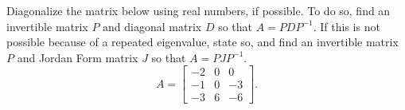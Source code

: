 \begin{exercise}
Diagonalize the matrix below using real numbers, if possible. To do so, find an invertible matrix $P$ and diagonal matrix $D$ so that $A = PDP^{-1}$. If this is not possible because of a repeated eigenvalue, state so, and find an invertible matrix $P$ and Jordan Form matrix $J$ so that $A = PJP^{-1}$. 
\[ A = \begin{bmatrix} -2 &0 & 0\\-1 & 0 &-3\\ -3 &  6 & -6 \end{bmatrix}.\]
\end{exercise} 
